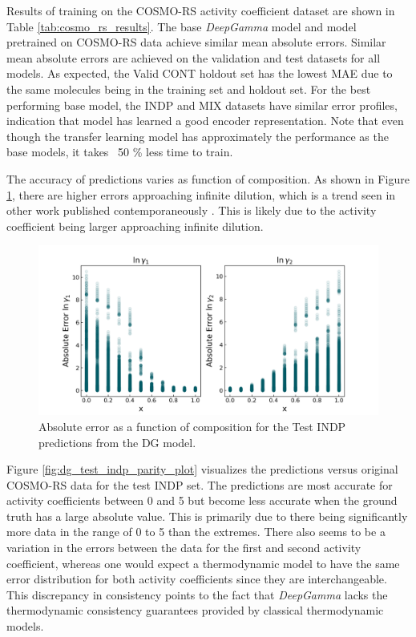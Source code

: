 Results of training on the COSMO-RS activity coefficient dataset are shown in Table \ref{tab:cosmo_rs_results}. The base \textit{DeepGamma} model  and model pretrained on COSMO-RS data achieve similar mean absolute errors. Similar mean absolute errors are achieved on the validation and test datasets for all models. As expected, the Valid CONT holdout set has the lowest MAE due to the same molecules being in the training set and holdout set.  For the best performing base model, the INDP and MIX datasets have similar error profiles, indication that model has learned a good encoder representation.  Note that even though the transfer learning model has approximately the performance as the base models, it takes ~50 \% less time to train. 

The accuracy of predictions varies as function of composition. As shown in Figure \ref{fig:absolute_error_composition}, there are higher errors approaching infinite dilution, which is a trend seen in other work published contemporaneously \cite{Winter2022}. This is likely due to the activity coefficient being larger approaching infinite dilution.

\begin{figure}
    \centering
    \includegraphics[width=\textwidth]{gfx/Chapter07/DG_test_indp_absolute_error_vs_composition.png}
    \caption{Absolute error as a function of composition for the Test INDP predictions from the DG model.}
    \label{fig:absolute_error_composition}
\end{figure}

Figure \ref{fig:dg_test_indp_parity_plot} visualizes the predictions versus original COSMO-RS data for the test INDP set. The predictions are most accurate for activity coefficients between 0 and 5 but become less accurate when the ground truth has a large absolute value. This is primarily due to there being significantly more data in the range of 0 to 5 than the extremes. There also seems to be a variation in the errors between the data for the first and second activity coefficient, whereas one would expect a thermodynamic model to have the same error distribution for both activity coefficients since they are interchangeable. This discrepancy in consistency points to the fact that \textit{DeepGamma} lacks the thermodynamic consistency guarantees provided by classical thermodynamic models.
 
